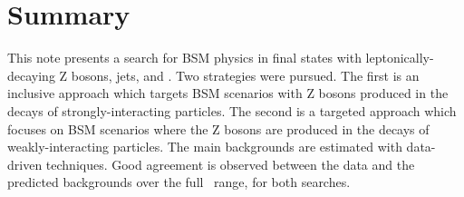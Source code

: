 \section{Summary}

This note presents a search for BSM physics in final states with leptonically-decaying Z bosons, jets, and \MET. 
Two strategies were pursued. The first is an inclusive approach which targets BSM scenarios with Z bosons produced
in the decays of strongly-interacting particles. The second is a targeted approach which focuses on BSM scenarios
where the Z bosons are produced in the decays of weakly-interacting particles. The main backgrounds are
estimated with data-driven techniques. Good agreement is observed between the data and the predicted backgrounds
over the full \MET\ range, for both searches. 

